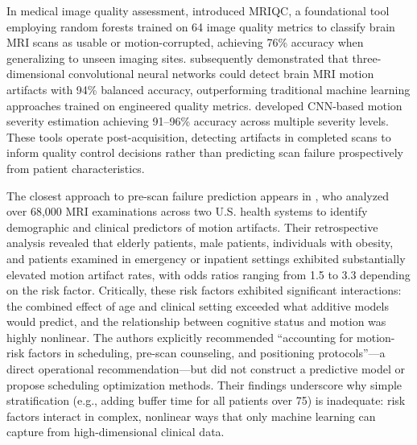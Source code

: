 \documentclass[11pt,a4paper]{article}
\begin{document}
In medical image quality assessment, \citet{esteban2017mriqc} introduced MRIQC, a foundational tool employing random forests trained on 64 image quality metrics to classify brain MRI scans as usable or motion-corrupted, achieving 76\% accuracy when generalizing to unseen imaging sites. \citet{vakli2023automatic} subsequently demonstrated that three-dimensional convolutional neural networks could detect brain MRI motion artifacts with 94\% balanced accuracy, outperforming traditional machine learning approaches trained on engineered quality metrics. \citet{beljaards2024motion} developed CNN-based motion severity estimation achieving 91--96\% accuracy across multiple severity levels. These tools operate post-acquisition, detecting artifacts in completed scans to inform quality control decisions rather than predicting scan failure prospectively from patient characteristics.

The closest approach to pre-scan failure prediction appears in \citet{porembka2025disparities}, who analyzed over 68,000 MRI examinations across two U.S. health systems to identify demographic and clinical predictors of motion artifacts. Their retrospective analysis revealed that elderly patients, male patients, individuals with obesity, and patients examined in emergency or inpatient settings exhibited substantially elevated motion artifact rates, with odds ratios ranging from 1.5 to 3.3 depending on the risk factor. Critically, these risk factors exhibited significant interactions: the combined effect of age and clinical setting exceeded what additive models would predict, and the relationship between cognitive status and motion was highly nonlinear. The authors explicitly recommended ``accounting for motion-risk factors in scheduling, pre-scan counseling, and positioning protocols''---a direct operational recommendation---but did not construct a predictive model or propose scheduling optimization methods. Their findings underscore why simple stratification (e.g., adding buffer time for all patients over 75) is inadequate: risk factors interact in complex, nonlinear ways that only machine learning can capture from high-dimensional clinical data.
\end{document}
